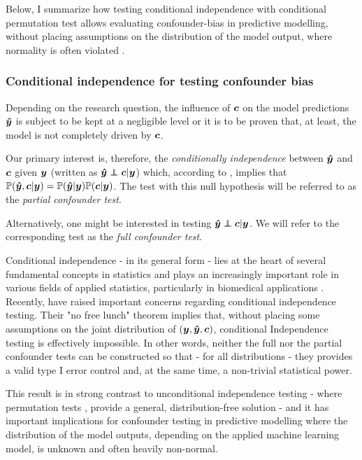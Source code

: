\documentclass{article}
\begin{document}
 Below, I summarize how testing conditional independence \citep{dawid1979conditional} with conditional permutation test \citep{berrett2020conditional} allows evaluating confounder-bias in predictive modelling, without placing assumptions on the distribution of the model output, where normality is often violated \citep{garcia2009study, kristensen2017whole}.

\subsubsection*{Conditional independence for testing confounder bias}

Depending on the research question, the influence of $\boldsymbol{c}$ on the model predictions $\boldsymbol{\hat{y}}$ is subject to be kept at a negligible level or it is to be proven that, at least, the model is not completely driven by $\boldsymbol{c}$.

Our primary interest is, therefore, the \emph{conditionally independence} between $\boldsymbol{\hat{y}}$ and $\boldsymbol{c}$ given $\boldsymbol{y}$ (written as $\yhat \independent \c | \y$) which, according to \cite{dawid1979conditional}, implies that $\mathbb{P}(\boldsymbol{\hat{y}}, \boldsymbol{c}|\boldsymbol{y}) = \mathbb{P}(\boldsymbol{\hat{y}}|\boldsymbol{y})\mathbb{P}(\boldsymbol{c}|\boldsymbol{y})$. The test with this null hypothesis will be referred to as the \emph{partial confounder test}.

Alternatively, one might be interested in testing $\yhat \independent \c | \y$. We will refer to the corresponding test as the \emph{full confounder test}.

 Conditional independence - in its general form - lies at the heart of several fundamental concepts in statistics and  plays an increasingly important role in various fields of applied statistics, particularly in biomedical applications \citep{spirtes2000causation, peters2016causal, fiedler2011mediation, candes2016panning}. Recently, \cite{shah2020hardness} have raised important concerns regarding conditional independence testing.
 Their "no free lunch" theorem implies that, without placing some assumptions on the joint distribution of $(\boldsymbol{y}, \boldsymbol{\hat{y}}, \boldsymbol{c})$, conditional Independence testing is effectively impossible. In other words, neither the full nor the partial confounder tests can be constructed so that - for all distributions - they provides a valid type I error control and, at the same time, a non-trivial statistical power.

This result is in strong contrast to unconditional independence testing - where permutation tests  \citep{pitman1937significance, fisher1942189}, provide a general, distribution-free solution - and it has important implications for confounder testing in predictive modelling where the distribution of the model outputs, depending on the applied machine learning model, is unknown and often heavily non-normal.
\end{document}
